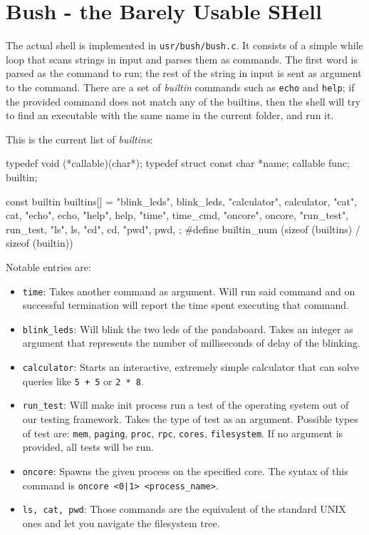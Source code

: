 \documentclass[a4paper,twoside,openright]{report}
\renewcommand{\t}[1]{%
	{\texttt{#1}}}
\begin{document}
\section{Bush - the Barely Usable SHell}

The actual shell is implemented in \t{usr/bush/bush.c}.  It consists of a
simple while loop that scans strings in input and parses them as commands.  The
first word is parsed as the command to run; the rest of the string in input is
sent as argument to the command. There are a set of \emph{builtin} commands
such as \t{echo} and \t{help}; if the provided command does not match any of
the builtins, then the shell will try to find an executable with the same name
in the current folder, and run it.

This is the current list of \emph{builtins}:
\begin{pandacode}
typedef void (*callable)(char*);
typedef struct {
	const char *name;
	callable func;
} builtin;

const builtin builtins[] = {
	 {"blink_leds", blink_leds},
	 {"calculator", calculator},
	 {"cat", cat},
	 {"echo", echo},
	 {"help", help},
	 {"time", time_cmd},
	 {"oncore", oncore},
	 {"run_test", run_test},
	 {"ls", ls},
	 {"cd", cd},
	 {"pwd", pwd},
};
#define builtin_num (sizeof (builtins) / sizeof (builtin))
\end{pandacode}

Notable entries are:
\begin{itemize}
	\item \t{time}:
		Takes another command as argument. Will run said command and on
		successful termination will report the time spent executing that
		command.

	\item \t{blink\_leds}:
		Will blink the two leds of the pandaboard. Takes an integer as 
		argument that represents the number of milliseconds of delay
		of the blinking.

	\item \t{calculator}:
		Starts an interactive, extremely simple calculator that can solve
		queries like \t{5 + 5} or \t{2 * 8}.

	\item \t{run\_test}: 
		Will make init process run a test of the operating system out of our
		testing framework. Takes the type of test as an argument.  Possible
		types of test are: \t{mem}, \t{paging}, \t{proc}, \t{rpc}, \t{cores},
		\t{filesystem}. If no argument is provided, all tests will be run.

	\item \t{oncore}:
		Spawns the given process on the specified core. 
		The syntax of this command is \t{oncore <0|1> <process\_name>}.

	\item \t{ls, cat, pwd}:
		Those commands are the equivalent of the standard UNIX ones and
		let you navigate the filesystem tree.

\end{itemize}
\end{document}
